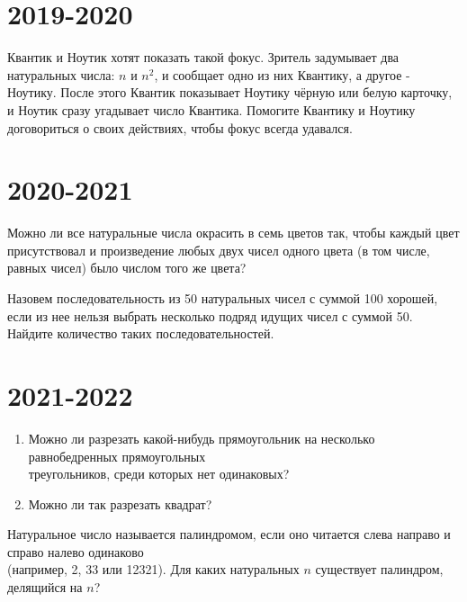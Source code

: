 \documentclass[11pt, a4paper]{../problems_template}
\begin{document}
\chapter{2019-2020}

\begin{exercise}[16]
Квантик и Ноутик хотят показать такой фокус. Зритель задумывает два натуральных числа: $n$ и $n^{2}$, и сообщает одно из них Квантику, а другое - Ноутику. После этого Квантик показывает Ноутику чёрную или белую карточку, и Ноутик сразу угадывает число Квантика. Помогите Квантику и Ноутику договориться о своих действиях, чтобы фокус всегда удавался.
\end{exercise}

\chapter{2020-2021}

\begin{exercise}
Можно ли все натуральные числа окрасить в семь цветов так, чтобы каждый цвет присутствовал и произведение любых двух чисел одного цвета (в том числе, равных чисел) было числом того же цвета?
\end{exercise}

\begin{exercise}
Назовем последовательность из 50 натуральных чисел с суммой 100 хорошей, если из нее нельзя выбрать несколько подряд идущих чисел с суммой 50. Найдите количество таких последовательностей.
\end{exercise}

\chapter{2021-2022}

\begin{exercise}
\begin{enumerate}
\item Можно ли разрезать какой-нибудь прямоугольник на несколько равнобедренных прямоугольных \\ треугольников, среди которых нет одинаковых?
\item Можно ли так разрезать квадрат?
\end{enumerate}
\end{exercise}

\begin{exercise}[8]
Натуральное число называется палиндромом, если оно читается слева направо и справо налево одинаково \\ (например, 2, 33 или 12321). Для каких натуральных $n$ существует палиндром, делящийся на $n$?
\end{exercise}
\end{document}
